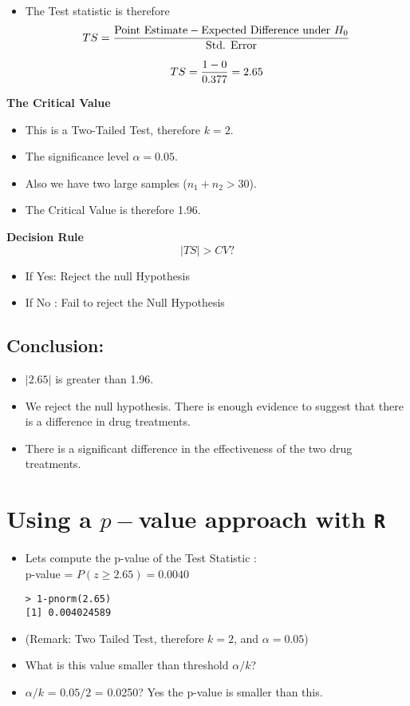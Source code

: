 \documentclass[a4paper,12pt]{article}
\begin{document}
\begin{itemize}
\item The Test statistic is therefore
\[ TS = {\mbox{Point Estimate} - \mbox{Expected Difference under } H_0 \over \mbox{Std. Error}} \]

\[TS = {1 - 0 \over 0.377 } = 2.65 \]


\end{itemize}


\noindent \textbf{The Critical Value}
\begin{itemize}

\item This is a Two-Tailed Test, therefore $k = 2$.
\item The significance level $\alpha = 0.05$. 
\item Also we have two large samples ($n_1 + n_2 > 30$). 
\item The Critical Value is therefore 1.96.
\end{itemize}

\noindent \textbf{Decision Rule}
\[ |TS| > CV ?  \]
\begin{itemize}
\item If Yes: Reject the null Hypothesis
\item If No : Fail to reject the Null Hypothesis
\end{itemize}
\subsection*{Conclusion:}
\begin{itemize}
    \item $|2.65|$ is greater than 1.96. 
    \item We reject the null hypothesis.  There is enough evidence to suggest that there is a difference in drug treatments.
    \item There is a significant difference in the effectiveness of the two drug treatments.
\end{itemize}
\newpage 
\section*{Using a $p-$value approach with \texttt{R}}
\begin{itemize}
\item Lets compute the p-value of the Test Statistic : \\
p-value = $P(z \geq 2.65) = 0.0040$
\begin{verbatim}
> 1-pnorm(2.65)
[1] 0.004024589
\end{verbatim}
\item (Remark: Two Tailed Test, therefore $k = 2$, and $\alpha = 0.05$)
\item What is this value smaller than threshold $\alpha / k$? \\
\item $\alpha / k$ = $0.05/2$ = 0.0250? Yes the p-value is smaller than this.
\end{itemize}
\end{document}
